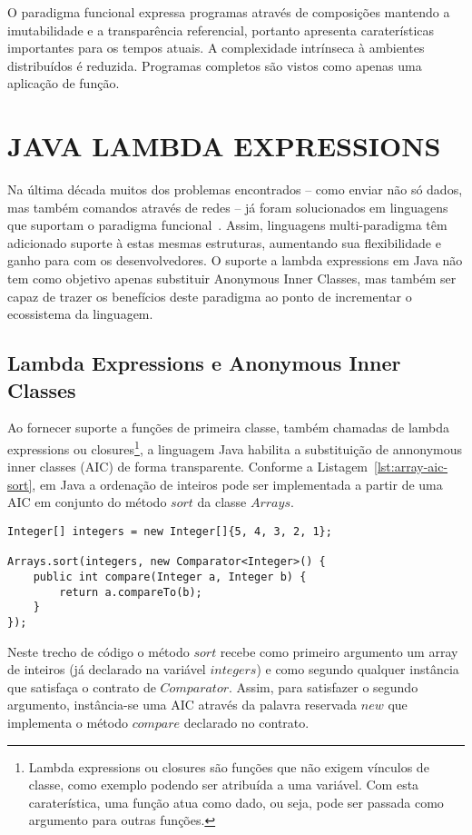 \documentclass[10pt, conference]{IEEEtran}
\begin{document}
O paradigma funcional expressa programas através de composições mantendo a imutabilidade e a transparência referencial, portanto apresenta caraterísticas importantes para os tempos atuais. A complexidade intrínseca à ambientes distribuídos é reduzida. Programas completos são vistos como apenas uma aplicação de função.

\section{JAVA LAMBDA EXPRESSIONS}

Na última década muitos dos problemas encontrados -- como enviar não só dados, mas também comandos através de redes -- já foram solucionados em linguagens que suportam o paradigma funcional~\cite{fischer2015java}. Assim, linguagens multi-paradigma têm adicionado suporte à estas mesmas estruturas, aumentando sua flexibilidade e ganho para com os desenvolvedores. O suporte a lambda expressions em Java não tem como objetivo apenas substituir Anonymous Inner Classes, mas também ser capaz de trazer os benefícios deste paradigma ao ponto de incrementar o ecossistema da linguagem.

\subsection{Lambda Expressions e Anonymous Inner Classes}
Ao fornecer suporte a funções de primeira classe, também chamadas de lambda expressions ou closures\footnote{Lambda expressions ou closures são funções que não exigem vínculos de classe, como exemplo podendo ser atribuída a uma variável. Com esta caraterística, uma função atua como dado, ou seja, pode ser passada como argumento para outras funções.}, a linguagem Java habilita a substituição de annonymous inner classes (AIC) de forma transparente. Conforme a Listagem~\ref{lst:array-aic-sort}, em Java a ordenação de inteiros pode ser implementada a partir de uma AIC em conjunto do método $sort$ da classe $Arrays$.

\begin{lstlisting}[caption={Sort - Anonymous Inner Class}, label={lst:array-aic-sort}]
Integer[] integers = new Integer[]{5, 4, 3, 2, 1};

Arrays.sort(integers, new Comparator<Integer>() {
    public int compare(Integer a, Integer b) {
        return a.compareTo(b);
    }
});
\end{lstlisting}

Neste trecho de código o método $sort$ recebe como primeiro argumento um array de inteiros (já declarado na variável $integers$) e como segundo qualquer instância que satisfaça o contrato de $Comparator$. Assim, para satisfazer o segundo argumento, instância-se uma AIC através da palavra reservada $new$ que implementa o método $compare$ declarado no contrato.
\end{document}
